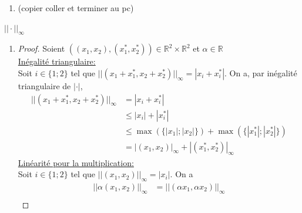 \documentclass[12pt,a4paper]{scrartcl}
\newcommand{\R}{\mathbb{R}}
\begin{document}
\begin{enumerate}
\begin{enumerate}
\begin{proof}
\begin{align*}
						      &= \sqrt{(\alpha x_1)^2+(\alpha y_1)^2}\\
						      &= \sqrt{\alpha^2(x_1^2+y_1^2)}\\
						      &= |\alpha|\sqrt{x_1^2+y_1^2}\\
						      &= |\alpha|||(x_1,y_1)||_2
			\end{align*}
			Comme $(x_1,y_1) \in \R^2$ et $\alpha \in \R$ sont quelconques, la linéarité est vérifiée sur $\R^2 \times \R$.\\
			\underline{$||(x,y)||_2=0 \iff (x,y)=(0,0)$:}\\
			\underline{$\implies$:}\\
				Par l'absurde, supposons $(x,y) \neq (0,0)$. Ceci implique $x \neq 0$ et $y \neq 0$ car, sinon, $||(x,y)||_2=\sqrt{x^2+y^2}=0$, qui implique $x^2+y^2=0$ donnerait $x=y=0$.
				On a alors $\sqrt{x^2+y^2}=0 \iff x^2+y^2=0 \iff x=y=0$. Ce qui contredit le résultat précédent.
				Il en vient alors que $(x,y) = (0,0)$.\\
			\underline{$\Longleftarrow$:}
				On a $||(0,0)||_2=\sqrt{0^2+0^2}=0$.
		\end{proof}
		\item (copier coller et terminer au pc)
		\end{enumerate}
	\underline{$||\cdot||_{\infty}$}
		\begin{enumerate}
		\item \begin{proof} Soient $((x_1,x_2),(x^*_1,x^*_2)) \in \R^2 \times \R^2$ et $\alpha \in \R$\\
                        \underline{Inégalité triangulaire:}\\
			Soit $i \in \{1;2\}$ tel que $||(x_1+x^*_1,x_2+x^*_2)||_{\infty}=|x_i+x^*_i|$. On a, par inégalité triangulaire de $|\cdot|$, 
			\begin{align*}
				||(x_1+x^*_1,x_2+x^*_2)||_{\infty} &= |x_i+x^*_i|\\
								   &\leq |x_i|+|x^*_i|\\
								   &\leq \max (\{ |x_1|;|x_2|\} )+\max (\{|x^*_1|;|x^*_2|\} )\\
								   &= |(x_1,x_2)|_{\infty}+|(x^*_1,x^*_2)|_{\infty}
			\end{align*}
			\underline{Linéarité pour la multiplication:}\\
			Soit $i \in \{1;2\}$ tel que $||(x_1,x_2)||_{\infty}=|x_i|$. On a
			\begin{align*}
				||\alpha(x_1,x_2)||_{\infty} &= ||(\alpha x_1,\alpha x_2)||_{\infty}\\

\end{align*}
\end{proof}
\end{enumerate}
\end{enumerate}
\end{document}
